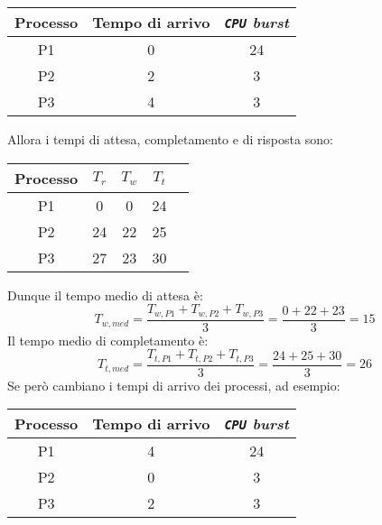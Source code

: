             \begin{table}[H]
                \centering
                \begin{tabular}{|c|c|c|}
                    \hline
                    \textbf{Processo} & \textbf{Tempo di arrivo} & \textbf{\textit{\texttt{CPU} burst}} \\ \hline
                    P1 & 0 & 24 \\ \hline
                    P2 & 2 & 3 \\ \hline
                    P3 & 4 & 3 \\ \hline
                \end{tabular}
            \end{table}
            Allora i tempi di attesa, completamento e di risposta sono:
            \begin{table}[H]
                \centering
                \begin{tabular}{|c|c|c|c|c|}
                    \hline
                    \textbf{Processo} & \textbf{$T_r$} & \textbf{$T_w$} & \textbf{$T_t$} \\ \hline
                    P1 & 0 & 0 & 24 \\ \hline
                    P2 & 24 & 22 & 25 \\ \hline
                    P3 & 27 & 23 & 30 \\ \hline
                \end{tabular}
            \end{table}
            Dunque il tempo medio di attesa è:
            $$
                T_{w,med} = \frac{T_{w,P1} + T_{w,P2} + T_{w,P3}}{3} = \frac{0 + 22 + 23}{3} = 15$$
            Il tempo medio di completamento è:
            $$
                T_{t,med} = \frac{T_{t,P1} + T_{t,P2} + T_{t,P3}}{3} = \frac{24 + 25 + 30}{3} = 26$$
            Se però cambiano i tempi di arrivo dei processi, ad esempio:
            \begin{table}[H]
                \centering
                \begin{tabular}{|c|c|c|}
                    \hline
                    \textbf{Processo} & \textbf{Tempo di arrivo} & \textbf{\textit{\texttt{CPU} burst}} \\ \hline
                    P1 & 4 & 24 \\ \hline
                    P2 & 0 & 3 \\ \hline
                    P3 & 2 & 3 \\ \hline
                \end{tabular}
            \end{table}
